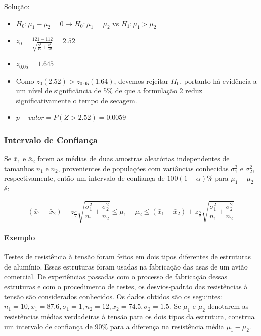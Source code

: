 \documentclass[
]{book}
\providecommand{\tightlist}{%
  \setlength{\itemsep}{0pt}\setlength{\parskip}{0pt}}
\begin{document}
Solução:

\begin{itemize}
\tightlist
\item
  \(H_0: \mu_1-\mu_2=0\rightarrow H_0: \mu_1=\mu_2\) vs \(H_1: \mu_1>\mu_2\)
\item
  \(z_0=\frac{121-112}{\sqrt{\frac{8^2}{10}+\frac{8^2}{10}}}=2.52\)
\item
  \(z_{0.05}=1.645\)
\item
  Como \(z_0(2.52)>z_{0.05}(1.64)\), devemos rejeitar \(H_0\), portanto há evidência a um nível de significância de 5\% de que a formulação 2 reduz significativamente o tempo de secagem.
\item
  \(p-valor=P(Z>2.52)=0.0059\)
\end{itemize}

\hypertarget{intervalo-de-confianuxe7a-1}{%
\subsubsection{Intervalo de Confiança}\label{intervalo-de-confianuxe7a-1}}

Se \(\bar x_1\) e \(\bar x_2\) forem as médias de duas amostras aleatórias independentes de tamanhos \(n_1\) e \(n_2\), provenientes de populações com variâncias conhecidas \(\sigma_1^2\) e \(\sigma_2^2\), respectivamente, então um intervalo de confiança de \(100(1-\alpha)\%\) para \(\mu_1-\mu_2\) é:

\[(\bar x_1-\bar x_2) -z_{\frac{\alpha}{2}}\sqrt{\frac{\sigma^2_1}{n_1}+\frac{\sigma^2_2}{n_2}}\leq \mu_1-\mu_2 \leq (\bar x_1-\bar x_2) +z_{\frac{\alpha}{2}}\sqrt{\frac{\sigma^2_1}{n_1}+\frac{\sigma^2_2}{n_2}}\]

\hypertarget{exemplo-10}{%
\paragraph{Exemplo}\label{exemplo-10}}

Testes de resistência à tensão foram feitos em dois tipos diferentes de estruturas de alumínio. Essas estruturas foram usadas na fabricação das asas de um avião comercial. De experiências passadas com o processo de fabricação dessas estruturas e com o procedimento de testes, os desvios-padrão das resistências à tensão são considerados conhecidos. Os dados obtidos são os seguintes: \(n_1=10, \bar x_1=87.6, \sigma_1=1, n_2=12, \bar x_2=74.5, \sigma_2=1.5\). Se \(\mu_1\) e \(\mu_2\) denotarem as resistências médias verdadeiras à tensão para os dois tipos da estrutura, construa um intervalo de confiança de 90\% para a diferença na resistência média \(\mu_1-\mu_2\).
\end{document}
